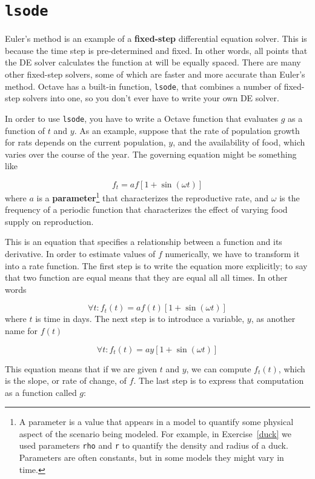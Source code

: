 \documentclass{book}
\begin{document}
\section{{\tt lsode}}
\label{lsode}

Euler's method is an example of a {\bf fixed-step} differential equation solver.
This is because the time step is pre-determined and fixed. In other words, all
points that the DE solver calculates the function at will be equally spaced.
There are many other fixed-step solvers, some of which are faster and more
accurate than Euler's method. Octave has a built-in function, {\tt lsode}, that
combines a number of fixed-step solvers into one, so you don't ever have to
write your own DE solver.

In order to use {\tt lsode}, you have to write a Octave function
that evaluates $g$ as a function of
$t$ and $y$. As an example, suppose that the rate of population growth for rats
depends on the current population, $y$, and the availability of food,
which varies over the course of the year.
The governing equation might be something like

\[ f_t = a f \left[1 + \sin (\omega t) \right] \]
%
where $a$ is
a {\bf parameter}\footnote{A parameter is a value that appears
in a model to quantify some physical aspect of the scenario being
modeled. For example, in Exercise~\ref{duck} we used parameters
{\tt rho} and {\tt r} to quantify the density and radius of a
duck. Parameters are often constants, but in some models they
might vary in time.} 
that characterizes the reproductive rate, and
$\omega$ is the frequency of a periodic function that characterizes
the effect of varying food supply on reproduction.

This is an equation that specifies a relationship between a
function and its derivative. In order to estimate values of
$f$ numerically, we have to transform it into a rate function.
The first step is to write the equation more explicitly; to
say that two function are equal means that they are equal
all all times. In other words

\[ \forall t: f_t(t) = a f(t) \left[1 + \sin (\omega t) \right] \]
%
where $t$ is time in days. The next step is to introduce a variable,
$y$, as another name for $f(t)$

\[ \forall t: f_t(t) = a y \left[1 + \sin (\omega t) \right] \]

This equation means that if we are given $t$ and $y$, we can
compute $f_t(t)$, which is the slope, or rate of change, of $f$.
The last step is to express that computation as a function called
$g$:
\end{document}
